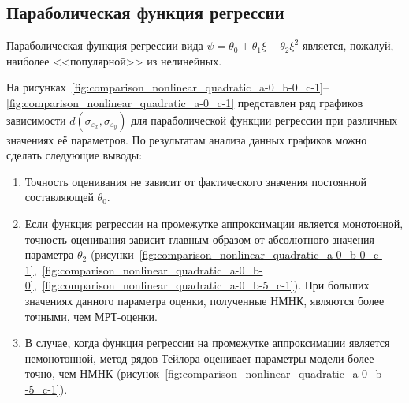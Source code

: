 


\pagebreak
\subsection{Параболическая функция регрессии}

Параболическая функция регрессии вида
\( \psi = \theta_0 + \theta_1 \xi + \theta_2 \xi^2 \)
является, пожалуй, наиболее <<популярной>> из нелинейных.

На рисунках~\ref{fig:comparison_nonlinear_quadratic_a-0_b-0_c-1}--\ref{fig:comparison_nonlinear_quadratic_a-0_c-1} представлен ряд графиков зависимости \( d(\sigma_{\varepsilon_x}, \sigma_{\varepsilon_y}) \)
для параболической функции регрессии при различных значениях её параметров.
По результатам анализа данных графиков можно сделать следующие выводы:
\begin{enumerate}
\item Точность оценивания не зависит от фактического значения постоянной составляющей \( \theta_0 \).
\item Если функция регрессии на промежутке аппроксимации является монотонной,
  точность оценивания зависит главным образом от абсолютного значения параметра \( \theta_2 \)
  (рисунки~\ref{fig:comparison_nonlinear_quadratic_a-0_b-0_c-1},~\ref{fig:comparison_nonlinear_quadratic_a-0_b-0},~\ref{fig:comparison_nonlinear_quadratic_a-0_b-5_c-1}).
  При больших значениях данного параметра оценки, полученные НМНК,
  являются более точными, чем МРТ-оценки.
\item В случае, когда функция регрессии на промежутке аппроксимации является немонотонной,
  метод рядов Тейлора оценивает параметры модели более точно, чем НМНК
  (рисунок~\ref{fig:comparison_nonlinear_quadratic_a-0_b--5_c-1}).
\end{enumerate}

